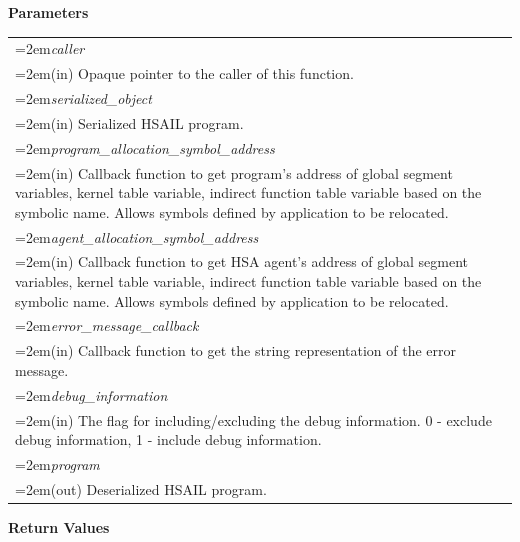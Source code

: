 \documentclass[final,oneside]{book}
\newcommand{\refarg}[1]{\textit{#1}}
\begin{document}
\noindent\textbf{Parameters}\\[-6mm]
\noindent\begin{longtable}{@{}>{\hangindent=2em}p{\textwidth}}
\refarg{caller}\\\hspace{2em}(in) Opaque pointer to the caller of this function.\\[2mm]
\refarg{serialized_\-object}\\\hspace{2em}(in) Serialized HSAIL program.\\[2mm]
\refarg{program_\-allocation_\-symbol_\-address}\\\hspace{2em}(in) Callback function to get program's address of global segment variables, kernel table variable, indirect function table variable based on the symbolic name. Allows symbols defined by application to be relocated.\\[2mm]
\refarg{agent_\-allocation_\-symbol_\-address}\\\hspace{2em}(in) Callback function to get HSA agent's address of global segment variables, kernel table variable, indirect function table variable based on the symbolic name. Allows symbols defined by application to be relocated.\\[2mm]
\refarg{error_\-message_\-callback}\\\hspace{2em}(in) Callback function to get the string representation of the error message.\\[2mm]
\refarg{debug_\-information}\\\hspace{2em}(in) The flag for including/excluding the debug information. 0 - exclude debug information, 1 - include debug information.\\[2mm]
\refarg{program}\\\hspace{2em}(out) Deserialized HSAIL program.
\end{longtable}
\vspace{-5mm}\noindent\textbf{Return Values}\\[-6mm]
\end{document}

